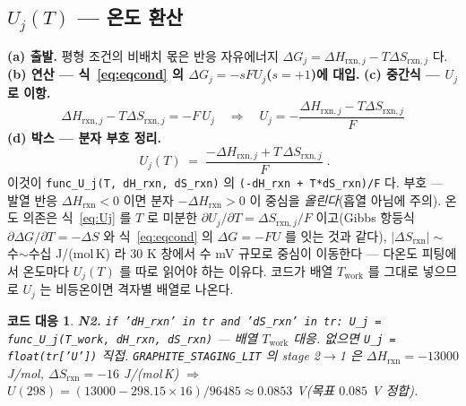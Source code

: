 \documentclass[11pt,a4paper]{article}
\newtheorem*{codebox}{코드 대응}
\newcommand{\rxn}{\mathrm{rxn}}
\newcommand{\work}{\mathrm{work}}
\newcommand{\code}[1]{\texttt{#1}}
\begin{document}
\subsection{$U_j(T)$ — 온도 환산}
\textbf{(a) 출발.} 평형 조건의 비배치 몫은 반응 자유에너지 $\Delta G_j=\Delta H_{\rxn,j}-T\Delta S_{\rxn,j}$ 다.
\textbf{(b) 연산 — 식~\eqref{eq:eqcond} 의 $\Delta G_j=-sFU_j$($s=+1$)에 대입.} \textbf{(c) 중간식 — $U_j$ 로 이항.}
\begin{equation}
\Delta H_{\rxn,j}-T\Delta S_{\rxn,j}=-F\,U_j
\quad\Longrightarrow\quad
U_j=-\frac{\Delta H_{\rxn,j}-T\Delta S_{\rxn,j}}{F}
\label{eq:Ujmid}
\end{equation}
\textbf{(d) 박스 — 분자 부호 정리.}
\begin{equation}
\boxed{\;U_j(T)\;=\;\frac{-\Delta H_{\rxn,j}+T\,\Delta S_{\rxn,j}}{F}\;.}
\label{eq:Uj}
\end{equation}
이것이 \code{func\_U\_j(T, dH\_rxn, dS\_rxn)} 의 \code{(-dH\_rxn + T*dS\_rxn)/F} 다. 부호 — 발열 반응
$\Delta H_\rxn<0$ 이면 분자 $-\Delta H_\rxn>0$ 이 중심을 \emph{올린다}(흡열 아님에 주의). 온도 의존은 식~\eqref{eq:Uj} 를
$T$ 로 미분한 $\partial U_j/\partial T=\Delta S_{\rxn,j}/F$ 이고(Gibbs 항등식 $\partial\Delta G/\partial T=-\Delta S$ 와
식~\eqref{eq:eqcond} 의 $\Delta G=-FU$ 를 잇는 것과 같다), $|\Delta S_\rxn|\sim$ 수$\sim$수십 J/(mol\,K) 라 $30$ K
창에서 수 mV 규모로 중심이 이동한다 — 다온도 피팅에서 온도마다 $U_j(T)$ 를 따로 읽어야 하는 이유다. 코드가 배열
$T_\work$ 를 그대로 넣으므로 $U_j$ 는 비등온이면 격자별 배열로 나온다.

\begin{codebox}
\textbf{N2.} \code{if 'dH\_rxn' in tr and 'dS\_rxn' in tr: U\_j = func\_U\_j(T\_work, dH\_rxn, dS\_rxn)}
— 배열 $T_\work$ 대응. 없으면 \code{U\_j = float(tr['U'])} 직접. \code{GRAPHITE\_STAGING\_LIT} 의 stage 2$\to$1 은
$\Delta H_\rxn=-13000$ J/mol, $\Delta S_\rxn=-16$ J/(mol\,K) $\Rightarrow$ $U(298)=(13000-298.15\times16)/96485
\approx0.0853$ V(목표 $0.085$ V 정합).
\end{codebox}
\end{document}
